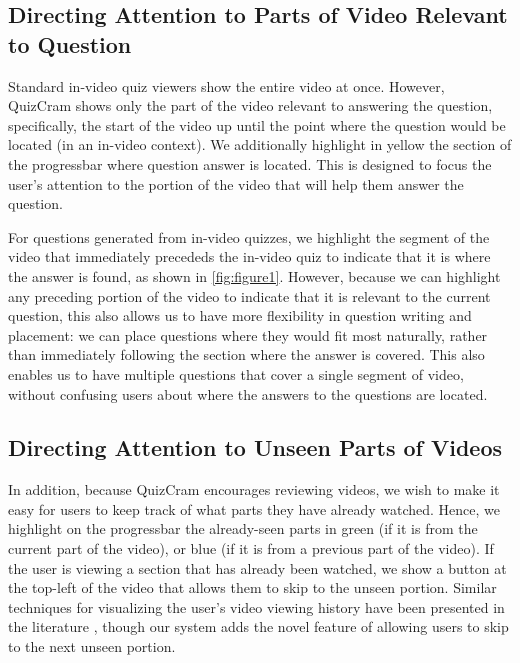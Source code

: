 \documentclass{chi-ext}
\begin{document}
\subsection{Directing Attention to Parts of Video Relevant to Question}

Standard in-video quiz viewers show the entire video at once. However, QuizCram shows only the part of the video relevant to answering the question, specifically, the start of the video up until the point where the question would be located (in an in-video context). We additionally highlight in yellow the section of the progressbar where question answer is located. This is designed to focus the user's attention to the portion of the video that will help them answer the question.


For questions generated from in-video quizzes, we highlight the segment of the video that immediately precededs the in-video quiz to indicate that it is where the answer is found, as shown in \autoref{fig:figure1}. However, because we can highlight any preceding portion of the video to indicate that it is relevant to the current question, this also allows us to have more flexibility in question writing and placement: we can place questions where they would fit most naturally, rather than immediately following the section where the answer is covered. This also enables us to have multiple questions that cover a single segment of video, without confusing users about where the answers to the questions are located.

\subsection{Directing Attention to Unseen Parts of Videos}

In addition, because QuizCram encourages reviewing videos, we wish to make it easy for users to keep track of what parts they have already watched. Hence, we highlight on the progressbar the already-seen parts in green (if it is from the current part of the video), or blue (if it is from a previous part of the video). If the user is viewing a section that has already been watched, we show a button at the top-left of the video that allows them to skip to the unseen portion. Similar techniques for visualizing the user's video viewing history have been presented in the literature \cite{socialnavigation} \cite{lecturescape}, though our system adds the novel feature of allowing users to skip to the next unseen portion.
\end{document}
